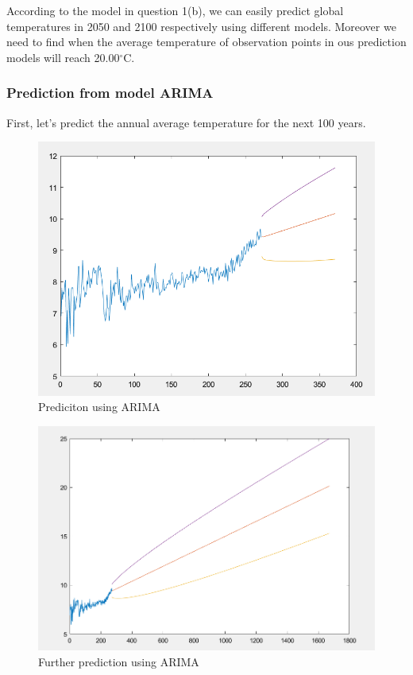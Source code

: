 \documentclass{apmcmthesis}
\def\oc{$^{\circ}$C\;}
\begin{document}
  According to the model in question 1(b), we can easily predict global temperatures in 2050 and 2100 respectively using different models. 
  Moreover we need to find when the average temperature of observation points in ous prediction models will reach 20.00\oc.
  
  \subsubsection{Prediction from model ARIMA}
  
  First, let's predict the annual average temperature for the next 100 years.
  
  \begin{figure}[htbp]
    \centering
    \includegraphics[scale=0.45]{ARIMA prediction 100.png}
    \caption{Prediciton using ARIMA}
  \end{figure}
  
  \begin{figure}[htbp]
    \centering
    \includegraphics[scale=0.4]{ARIMA prediction 1400.png}
    \caption{Further prediction using ARIMA}
  \end{figure}
  
\end{document}
